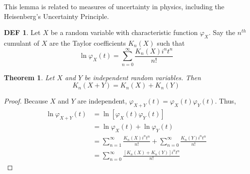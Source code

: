 \documentclass{article}
\newtheorem{theorem}{Theorem}
\theoremstyle{definition}\newtheorem{definition}{DEF}
\theoremstyle{lemma}\newtheorem{lemma}{Lemma}
\theoremstyle{corrolary}\newtheorem{corrolary}{Cor}
\begin{document}
This lemma is related to measures of uncertainty in physics, including the Heisenberg's Uncertainty Principle.

\begin{definition}
Let $X$ be a random variable with characteristic function $\varphi_X$.
Say the $n^{th}$ cumulant of $X$ are the Taylor coefficients $K_n(X)$ such that
\begin{equation}
\ln \varphi_X(t)=\sum_{n=0}^\infty \frac{K_n(X)i^n t^n}{n!}
\end{equation}
\end{definition}

\begin{theorem}
Let $X$ and $Y$ be independent random variables.
Then
\begin{equation}
K_n(X+Y) = K_n(X) + K_n(Y)
\end{equation}
\end{theorem}
\begin{proof}
Because $X$ and $Y$ are independent, $\varphi_{X+Y}(t)=\varphi_X(t)\varphi_Y(t)$.
Thus,
\begin{align*}
\ln \varphi_{X+Y}(t) &= \ln\left[ \varphi_X(t) \varphi_Y(t)\right]\\
&= \ln \varphi_X(t) + \ln \varphi_Y(t)\\
&=\sum_{n=1}^\infty \frac{K_n(X)i^n t^n}{n!} + \sum_{n=0}^\infty \frac{K_n(Y)i^n t^n}{n!}\\
&=\sum_{n=0}^\infty \frac{[K_n(X)+K_n(Y)]i^n t^n}{n!}
\end{align*}
\end{proof}
\end{document}

